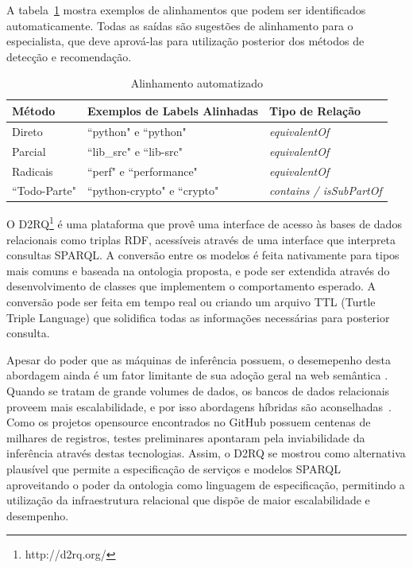\documentclass[sigconf]{acmart}
\begin{document}
A tabela~\ref{tab:matching} mostra exemplos de alinhamentos que podem ser identificados automaticamente. Todas as saídas são sugestões de alinhamento para o especialista, que deve aprová-las para utilização posterior dos métodos de detecção e recomendação.

\begin{table}[!h]
  \centering
\begin{tabular}{@{}|l|l|l|@{}}
\hline
Método       & Exemplos de Labels Alinhadas           & Tipo de Relação                 \\ \hline
Direto       & ``python" e ``python"        & \textit{equivalentOf}           \\
Parcial      & ``lib\_src" e ``lib-src"     & \textit{equivalentOf}           \\
Radicais     & ``perf" e ``performance"     & \textit{equivalentOf}           \\
``Todo-Parte" & ``python-crypto" e ``crypto" & \textit{contains / isSubPartOf} \\ \hline
\end{tabular}
\caption{Alinhamento automatizado}\label{tab:matching}
\end{table}

O D2RQ\footnote{http://d2rq.org/} é uma plataforma que provê uma interface de acesso às bases de dados relacionais como triplas RDF, acessíveis através de uma interface que interpreta consultas SPARQL. A conversão entre os modelos é feita nativamente para tipos mais comuns e baseada na ontologia proposta, e pode ser extendida através do desenvolvimento de classes que implementem o comportamento esperado. A conversão pode ser feita em tempo real ou criando um arquivo TTL (Turtle Triple Language) que solidifica todas as informações necessárias para posterior consulta.

Apesar do poder que as máquinas de inferência possuem, o desemepenho desta abordagem ainda é um fator limitante de sua adoção geral na web semântica \cite{shvaiko2013}. Quando se tratam de grande volumes de dados, os bancos de dados relacionais proveem mais escalabilidade, e por isso abordagens híbridas são aconselhadas~\cite{hepp2008}. Como os projetos opensource encontrados no GitHub possuem centenas de milhares de registros, testes preliminares apontaram pela inviabilidade da inferência através destas tecnologias. Assim, o D2RQ se mostrou como alternativa plausível que permite a especificação de serviços e modelos SPARQL aproveitando o poder da ontologia como linguagem de especificação, permitindo a utilização da infraestrutura relacional que dispõe de maior escalabilidade e desempenho.
\end{document}

